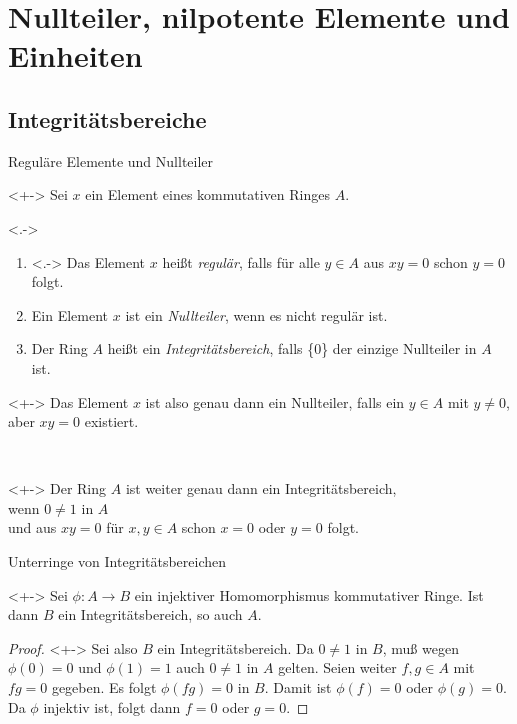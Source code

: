 \section{Nullteiler, nilpotente Elemente und Einheiten}

\subsection{Integritätsbereiche}

\begin{frame}{Reguläre Elemente und Nullteiler}
    \begin{visibleenv}<+->
        Sei \(x\) ein Element eines kommutativen Ringes \(A\).
    \end{visibleenv}
    \begin{definition}<.->
        \begin{enumerate}[<+->]
        \item<.->
            Das Element \(x\) heißt \emph{regulär}, falls für alle \(y \in A\)
            aus \(x y = 0\) schon \(y = 0\) folgt.
        \item
            Ein Element \(x\) ist ein \emph{Nullteiler}, wenn es nicht regulär ist.
        \item
            Der Ring \(A\) heißt ein \emph{Integritätsbereich}, falls \{0\} der
            einzige Nullteiler in \(A\) ist.
        \end{enumerate}
    \end{definition}
    \begin{visibleenv}<+->
        Das Element \(x\) ist also genau dann ein Nullteiler, falls ein
        \(y \in A\) mit \(y \neq 0\), aber \(x y = 0\) existiert.
    \end{visibleenv}
    \\
    \begin{visibleenv}<+->
        Der Ring \(A\) ist weiter genau dann ein Integritätsbereich,\\
        wenn \(0 \neq 1\)
        in \(A\)\\ und aus \(x y = 0\) für \(x, y \in A\) schon \(x = 0\) oder
        \(y = 0\) folgt.
    \end{visibleenv}
\end{frame}

\begin{frame}{Unterringe von Integritätsbereichen}
	\begin{proposition}<+->
		Sei \(\phi\colon A \to B\) ein injektiver Homomorphismus kommutativer Ringe.
		Ist dann \(B\) ein Integritätsbereich, so auch \(A\).
	\end{proposition}
	\begin{proof}<+->
		Sei also \(B\) ein Integritätsbereich.
		Da \(0 \neq 1\) in \(B\), muß wegen \(\phi(0) = 0\) und \(\phi(1) = 1\)
		auch \(0 \neq 1\) in \(A\) gelten.
		Seien weiter \(f, g \in A\) mit \(f g = 0\) gegeben. Es folgt
		\(\phi(fg) = 0\) in \(B\). Damit ist \(\phi(f) = 0\) oder \(\phi(g) = 0\).
		Da \(\phi\) injektiv ist, folgt dann \(f = 0\) oder \(g = 0\).
	\end{proof}
\end{frame}

